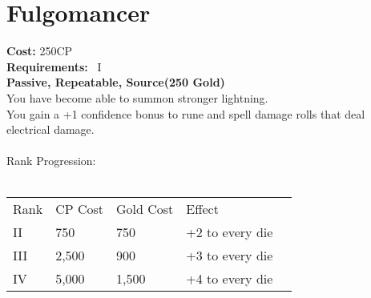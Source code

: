 \section{Fulgomancer}\label{perk:fulgomancer}
\textbf{Cost:} 250CP\\
\textbf{Requirements:}~ I\\
\textbf{Passive, Repeatable, Source(250 Gold)}\\
You have become able to summon stronger lightning.\\
You gain a +1 confidence bonus to rune and spell damage rolls that deal electrical damage.\\
\\
Rank Progression:\\
\\
\begin{tabular}{l | l | l | l | l}
    Rank & CP Cost & Gold Cost &  Effect\\
    II & 750 & 750 & +2 to every die\\
    III & 2,500 & 900 & +3 to every die\\
    IV & 5,000 & 1,500 & +4 to every die\\
\end{tabular}